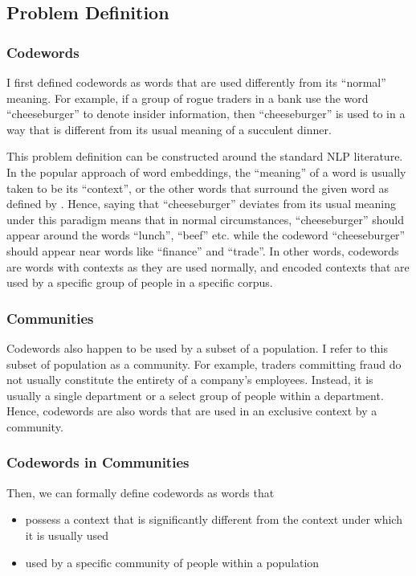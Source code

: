 \subsection{Problem Definition}

\subsubsection{Codewords}

I first defined codewords as words that are used differently from its ``normal'' meaning. For example, if a group of rogue traders in a bank use the word ``cheeseburger'' to denote insider information, then ``cheeseburger'' is used to in a way that is different from its usual meaning of a succulent dinner.

This problem definition can be constructed around the standard NLP literature. In the popular approach of word embeddings, the ``meaning'' of a word is usually taken to be its ``context'', or the other words that surround the given word as defined by \cite{mikolov2013distributed}. Hence, saying that ``cheeseburger'' deviates from its usual meaning under this paradigm means that in normal circumstances, ``cheeseburger'' should appear around the words ``lunch'', ``beef'' etc. while the codeword ``cheeseburger'' should appear near words like ``finance'' and ``trade''. In other words, codewords are words with contexts as they are used normally, and encoded contexts that are used by a specific group of people in a specific corpus.

\subsubsection{Communities}

Codewords also happen to be used by a subset of a population. I refer to this subset of population as a community. For example, traders committing fraud do not usually constitute the entirety of a company's employees. Instead, it is usually a single department or a select group of people within a department. Hence, codewords are also words that are used in an exclusive context by a community.

\subsubsection{Codewords in Communities}

Then, we can formally define codewords as words that

\begin{itemize}
\item possess a context that is significantly different from the context under which it is usually used
\item used by a specific community of people within a population
\end{itemize}

